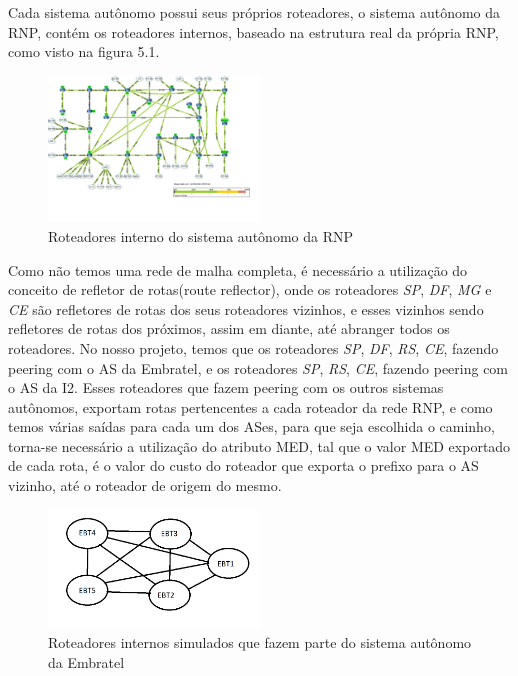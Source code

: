 \documentclass[12pt,a4paper]{report}
\begin{document}
Cada sistema aut\^onomo possui seus pr\'oprios roteadores, o sistema aut\^onomo da RNP, cont\'em os roteadores internos, baseado na estrutura real da pr\'opria RNP, como visto na figura 5.1. 

\begin{figure}[!htb]
 \centering
 \includegraphics[width=0.5\textwidth]{Imagens/rnp}
  \caption{\label{fig:rnp} Roteadores interno do sistema aut\^onomo da RNP}
\end{figure}

Como n\~ao temos uma rede de malha completa, \'e necess\'ario a utiliza\c{c}\~ao do conceito de refletor de rotas(route reflector), onde os roteadores \textit{SP}, \textit{DF}, \textit{MG} e \textit{CE} s\~ao refletores de rotas dos seus roteadores vizinhos, e esses vizinhos sendo refletores de rotas dos pr\'oximos, assim em diante, at\'e abranger todos os roteadores. No nosso projeto, temos que os roteadores \textit{SP}, \textit{DF}, \textit{RS}, \textit{CE}, fazendo peering com o AS da Embratel, e os roteadores \textit{SP}, \textit{RS}, \textit{CE}, fazendo peering com o AS da I2. Esses roteadores que fazem peering com os outros sistemas aut\^onomos, exportam rotas pertencentes a cada roteador da rede RNP, e como temos v\'arias sa\'idas para cada um dos ASes, para que seja escolhida o caminho, torna-se necess\'ario a utiliza\c{c}\~ao do atributo MED, tal que o valor MED exportado de cada rota, \'e o valor do custo do roteador que exporta o prefixo para o AS vizinho, at\'e o roteador de origem do mesmo.

\begin{figure}[!htb]
 \centering
 \includegraphics[width=0.5\textwidth]{Imagens/EMBRATEL}
  \caption{\label{fig:Embratel} Roteadores internos simulados que fazem parte do sistema aut\^onomo da Embratel}
\end{figure}
\end{document}
